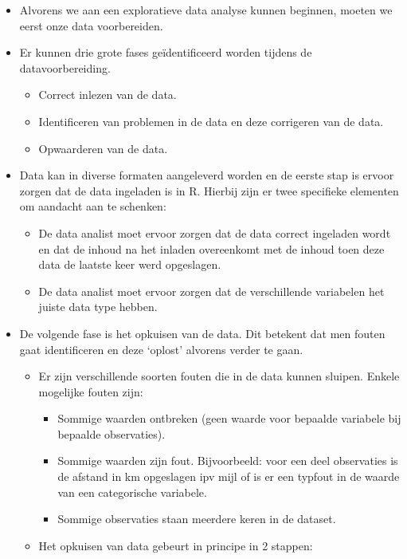 \documentclass[]{tufte-book}
\providecommand{\tightlist}{%
  \setlength{\itemsep}{0pt}\setlength{\parskip}{0pt}}
\begin{document}
\begin{itemize}
\tightlist
\item
  Alvorens we aan een exploratieve data analyse kunnen beginnen, moeten we eerst onze data voorbereiden.
\item
  Er kunnen drie grote fases geïdentificeerd worden tijdens de datavoorbereiding.

  \begin{itemize}
  \tightlist
  \item
    Correct inlezen van de data.
  \item
    Identificeren van problemen in de data en deze corrigeren van de data.
  \item
    Opwaarderen van de data.
  \end{itemize}
\item
  Data kan in diverse formaten aangeleverd worden en de eerste stap is ervoor zorgen dat de data ingeladen is in R. Hierbij zijn er twee specifieke elementen om aandacht aan te schenken:

  \begin{itemize}
  \tightlist
  \item
    De data analist moet ervoor zorgen dat de data correct ingeladen wordt en dat de inhoud na het inladen overeenkomt met de inhoud toen deze data de laatste keer werd opgeslagen.
  \item
    De data analist moet ervoor zorgen dat de verschillende variabelen het juiste data type hebben.
  \end{itemize}
\item
  De volgende fase is het opkuisen van de data. Dit betekent dat men fouten gaat identificeren en deze `oplost' alvorens verder te gaan.

  \begin{itemize}
  \tightlist
  \item
    Er zijn verschillende soorten fouten die in de data kunnen sluipen. Enkele mogelijke fouten zijn:

    \begin{itemize}
    \tightlist
    \item
      Sommige waarden ontbreken (geen waarde voor bepaalde variabele bij bepaalde observaties).
    \item
      Sommige waarden zijn fout. Bijvoorbeeld: voor een deel observaties is de afstand in km opgeslagen ipv mijl of is er een typfout in de waarde van een categorische variabele.
    \item
      Sommige observaties staan meerdere keren in de dataset.
    \end{itemize}
  \item
    Het opkuisen van data gebeurt in principe in 2 stappen:


\end{itemize}
\end{itemize}
\end{document}

